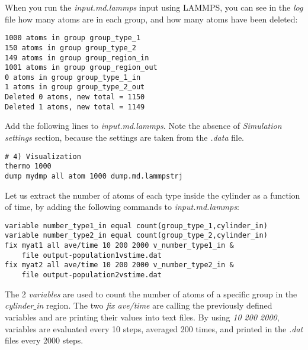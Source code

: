 {\color{red}When you run the \textit{input.md.lammps} input using LAMMPS, you can see in the \textit{log} file how many atoms are in each group, and how many atoms have been deleted:}
\begin{verbatim}
1000 atoms in group group_type_1
150 atoms in group group_type_2
149 atoms in group group_region_in
1001 atoms in group group_region_out
0 atoms in group group_type_1_in
1 atoms in group group_type_2_out
Deleted 0 atoms, new total = 1150
Deleted 1 atoms, new total = 1149
\end{verbatim}
Add the following lines to \textit{input.md.lammps}. Note the absence of \textit{Simulation settings} section, because the settings are taken from the \textit{.data} file.
\begin{verbatim}
# 4) Visualization
thermo 1000
dump mydmp all atom 1000 dump.md.lammpstrj
\end{verbatim}
Let us extract the number of atoms of each type inside the cylinder as a function of time, by adding the following commands to \textit{input.md.lammps}:
\begin{verbatim}
variable number_type1_in equal count(group_type_1,cylinder_in)
variable number_type2_in equal count(group_type_2,cylinder_in)
fix myat1 all ave/time 10 200 2000 v_number_type1_in &
    file output-population1vstime.dat
fix myat2 all ave/time 10 200 2000 v_number_type2_in &
    file output-population2vstime.dat
\end{verbatim}
The 2 \textit{variables} are used to count the number of atoms of a specific group in the \textit{cylinder$\_$in} region. The two \textit{fix ave/time} are calling the previously defined variables and are printing their values into text files. By using \textit{10 200 2000}, variables are evaluated every 10 steps, averaged 200 times, and printed in the \textit{.dat} files every 2000 steps.

